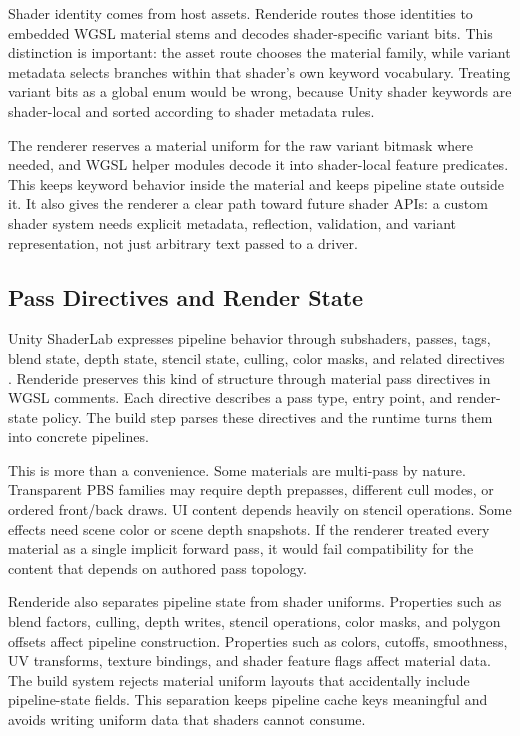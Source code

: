 \documentclass[acmtog,screen,nonacm]{acmart}
\begin{document}
Shader identity comes from host assets. Renderide routes those identities to embedded WGSL material stems and decodes shader-specific variant bits. This distinction is important: the asset route chooses the material family, while variant metadata selects branches within that shader's own keyword vocabulary. Treating variant bits as a global enum would be wrong, because Unity shader keywords are shader-local and sorted according to shader metadata rules.

The renderer reserves a material uniform for the raw variant bitmask where needed, and WGSL helper modules decode it into shader-local feature predicates. This keeps keyword behavior inside the material and keeps pipeline state outside it. It also gives the renderer a clear path toward future shader APIs: a custom shader system needs explicit metadata, reflection, validation, and variant representation, not just arbitrary text passed to a driver.

\subsection{Pass Directives and Render State}

Unity ShaderLab expresses pipeline behavior through subshaders, passes, tags, blend state, depth state, stencil state, culling, color masks, and related directives \citep{unityShaderLabSubShader,unitySubShaderTags,unityShaderLabBlend,unityShaderLabStencil,unityShaderLabCullDepth}. Renderide preserves this kind of structure through material pass directives in WGSL comments. Each directive describes a pass type, entry point, and render-state policy. The build step parses these directives and the runtime turns them into concrete pipelines.

This is more than a convenience. Some materials are multi-pass by nature. Transparent PBS families may require depth prepasses, different cull modes, or ordered front/back draws. UI content depends heavily on stencil operations. Some effects need scene color or scene depth snapshots. If the renderer treated every material as a single implicit forward pass, it would fail compatibility for the content that depends on authored pass topology.

Renderide also separates pipeline state from shader uniforms. Properties such as blend factors, culling, depth writes, stencil operations, color masks, and polygon offsets affect pipeline construction. Properties such as colors, cutoffs, smoothness, UV transforms, texture bindings, and shader feature flags affect material data. The build system rejects material uniform layouts that accidentally include pipeline-state fields. This separation keeps pipeline cache keys meaningful and avoids writing uniform data that shaders cannot consume.
\end{document}
